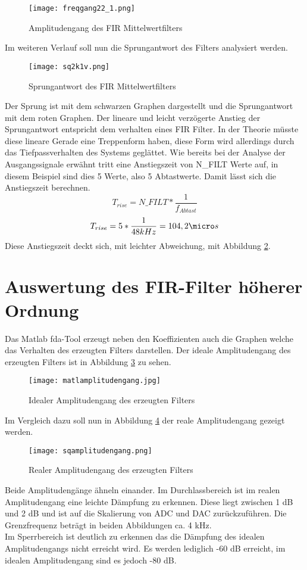 \begin{figure}[H]
  \centering
    \texttt{[image: freqgang22\_1.png]}
  \caption{Amplitudengang des FIR Mittelwertfilters}
  \label{fig:AmpgangFIRMit}
\end{figure}
Im weiteren Verlauf soll nun die Sprungantwort des Filters analysiert werden.
\begin{figure}[H]
  \centering
    \texttt{[image: sq2k1v.png]}
  \caption{Sprungantwort des FIR Mittelwertfilters}
  \label{fig:SprungFIRMit}
\end{figure}
Der Sprung ist mit dem schwarzen Graphen dargestellt und die Sprungantwort mit dem 
roten Graphen. Der lineare und leicht verzögerte Anstieg der Sprungantwort 
entspricht dem verhalten eines FIR Filter. In der Theorie m\"usste diese lineare 
Gerade eine Treppenform haben, diese Form wird allerdings durch das Tiefpassverhalten 
des Systems gegl\"attet. Wie bereits bei der Analyse der Ausgangssignale 
erw\"ahnt tritt eine Anstiegszeit von N\_FILT Werte auf, in diesem 
Beispiel sind dies 5 Werte, also 5 Abtastwerte. Damit lässt sich die 
Anstiegszeit berechnen.
\begin{equation}
  T_{rise} = N\_FILT * \frac{1}{f_{Abtast}}
\end{equation}
\begin{equation*}
  T_{rise} = 5* \frac{1}{48 kHz} = 104,2\micro s
\end{equation*}
Diese Anstiegszeit deckt sich, mit leichter Abweichung, mit Abbildung 
\ref{fig:SprungFIRMit}.

\section{Auswertung des FIR-Filter h\"oherer Ordnung}
Das Matlab \gls{fda}-Tool erzeugt neben den Koeffizienten auch die Graphen 
welche das Verhalten des erzeugten Filters darstellen. Der ideale Amplitudengang des 
erzeugten Filters ist in Abbildung \ref{fig:MatlabAmpgang} zu sehen. 
\begin{figure}[H]
  \centering
    \texttt{[image: matlamplitudengang.jpg]}
  \caption{Idealer Amplitudengang des erzeugten Filters}
  \label{fig:MatlabAmpgang}
\end{figure}
Im Vergleich dazu soll nun in Abbildung \ref{fig:DSPAmpgang} der reale Amplitudengang gezeigt werden.
\begin{figure}[H]
  \centering
    \texttt{[image: sqamplitudengang.png]}
  \caption{Realer Amplitudengang des erzeugten Filters}
  \label{fig:DSPAmpgang}
\end{figure}
Beide Amplitudeng\"ange \"ahneln einander. Im Durchlassbereich ist im realen Amplitudengang eine leichte D\"ampfung zu erkennen. 
Diese liegt zwischen 1 dB und 2 dB und ist auf die Skalierung von ADC und DAC zur\"uckzuf\"uhren.
Die Grenzfrequenz betr\"agt in beiden Abbildungen ca. 4 kHz.\\
Im Sperrbereich ist deutlich zu erkennen das die D\"ampfung des idealen Amplitudengangs nicht erreicht wird. Es werden lediglich -60 dB erreicht, im idealen Amplitudengang sind es jedoch -80 
dB.\\\par

